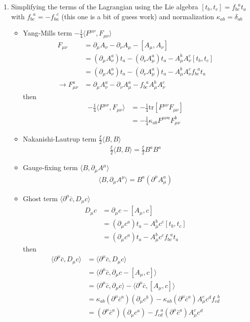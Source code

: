 \documentclass[10pt,a4paper]{article}
\theoremstyle{definition}
\begin{document}
\begin{enumerate}
\item Simplifying the terms of the Lagrangian using the Lie algebra $[t_b,t_c]=f_{bc}^{\;\;a}t_a$ with $f_{bc}^{\;\;a}=-f_{ba}^{\;\;c}$ (this one is a bit of guess work) and normalization $\kappa_{ab}=\delta_{ab}$
\begin{itemize}
\item  Yang-Mills term $-\frac{1}{4}\langle F^{\mu\nu},F_{\mu\nu}\rangle$
\begin{align}
F_{\mu\nu}
&=\partial_\mu A_\nu-\partial_\nu A_\mu-[A_\mu,A_\nu]\\
&=(\partial_\mu A^a_\nu)t_a-(\partial_\nu A^a_\mu)t_a-A^b_\mu A^c_\nu[t_b, t_c]\\
&=(\partial_\mu A^a_\nu)t_a-(\partial_\nu A^a_\mu)t_a-A^b_\mu A^c_\nu f_{bc}^{\;\;a}t_a\\
\rightarrow F^a_{\mu\nu}
&=\partial_\mu A^a_\nu-\partial_\nu A^a_\mu-f_{bc}^{\;\;a} A^b_\mu A^c_\nu
\end{align}
then
\begin{align}
-\frac{1}{4}\langle F^{\mu\nu},F_{\mu\nu}\rangle
&=-\frac{1}{4}\text{tr}[F^{\mu\nu}F_{\mu\nu}]\\
&=-\frac{1}{4}\kappa_{ab}F^{\mu\nu a}F^b_{\mu\nu}
\end{align}
\item Nakanishi-Lautrup term $\frac{\xi}{2}\langle B,B\rangle$
\begin{align}
\frac{\xi}{2}\langle B,B\rangle=\frac{\xi}{2}B^aB^a
\end{align}
\item Gauge-fixing term $\langle B,\partial_\mu A^\mu\rangle$
\begin{align}
\langle B,\partial_\mu A^\mu\rangle = B^a(\partial^\mu A_\mu^a)
\end{align}

\item Ghost term $\langle \partial^\mu\bar{c},D_\mu c\rangle$
\begin{align}
D_\mu c
&=\partial_\mu c-[A_\mu,c]\\
&=(\partial_\mu c^a)t_a-A^b_\mu c^c[t_b,t_c]\\
&=(\partial_\mu c^a)t_a-A^b_\mu c^c f_{bc}^{\;\;a}t_a
\end{align}
then
\begin{align}
\langle \partial^\mu\bar{c},D_\mu c\rangle
&=\langle \partial^\mu\bar{c},D_\mu c\rangle\\
&=\langle \partial^\mu\bar{c},\partial_\mu c-[A_\mu,c]\rangle\\
&=\langle \partial^\mu\bar{c},\partial_\mu c\rangle-\langle\partial^\mu\bar{c},[A_\mu,c]\rangle\\
&=\kappa_{ab}(\partial^\mu\bar{c}^a)(\partial_\mu c^b)
-\kappa_{ab}(\partial^\mu\bar{c}^a)A_\mu^c c^d f_{cd}^{\;\;b}\\
&=(\partial^\mu\bar{c}^a)(\partial_\mu c^a)
-f_{cd}^{\;\;a}(\partial^\mu\bar{c}^a)A_\mu^c c^d
\end{align}


\end{itemize}
\end{enumerate}
\end{document}
